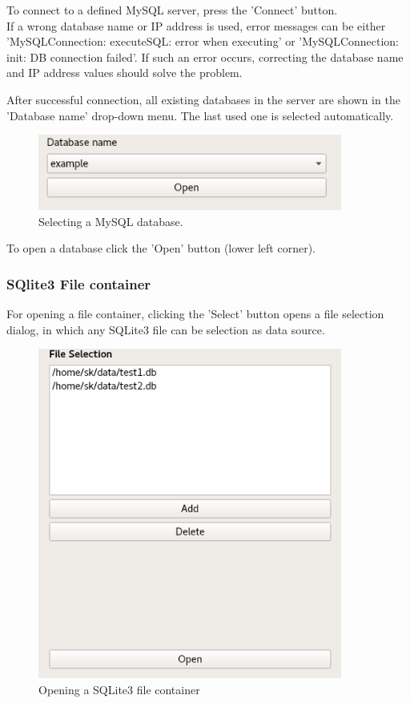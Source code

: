 \documentclass[10pt,letterpaper,extrafontsizes]{memoir}
\begin{document}
To connect to a defined MySQL server, press the 'Connect' button.\\

If  a  wrong  database  name  or  IP  address  is  used,  error  messages  can  be  either  'MySQLConnection: executeSQL: error when executing' or 'MySQLConnection:  init:  DB connection failed'.  If such an error occurs, correcting the database name and IP address values should solve the problem.

After successful connection, all existing databases in the server are shown in the 'Database name' drop-down menu. The last used one is selected automatically.

\begin{figure}[H]
  \center
    \includegraphics[width=10cm]{../screenshots/mysql_database_selection.png}
  \caption{Selecting a MySQL database.}
  \label{fig:mysql_db_select}
\end{figure}


To open a database click the 'Open' button (lower left corner).

\subsubsection{SQlite3 File container}
For opening a file container, clicking the 'Select' button opens a file selection dialog, in which any SQLite3 file can be selection as data source.

\begin{figure}[H]
  \center
    \includegraphics[width=10cm]{../screenshots/sqlite3_open.png}
  \caption{Opening a SQLite3 file container}
  \label{fig:sqlite3_open}
\end{figure}
\end{document}
